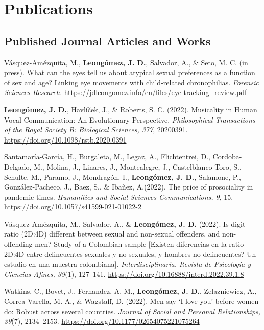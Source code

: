 \documentclass[11pt,a4paper,]{awesome-cv}
\begin{document}
\hypertarget{publications}{%
\section{Publications}\label{publications}}

\hypertarget{section}{%
\subsection{\texorpdfstring{\textbf{Published Journal Articles and Works}}{}}\label{section}}

\begingroup
\setlength{\parindent}{-0.5in}
\setlength{\leftskip}{0.5in}

Vásquez-Amézquita, M., \textbf{Leongómez, J. D.}, Salvador, A., \& Seto,
M. C. (in press). What can the eyes tell us about atypical sexual
preferences as a function of sex and age? Linking eye movements with
child-related chronophilias. \emph{Forensic Sciences Research}.
\url{https://jdleongomez.info/en/files/eye-tracking_review.pdf}

\textbf{Leongómez, J. D.}, Havlíček, J., \& Roberts, S. C. (2022).
Musicality in Human Vocal Communication: An Evolutionary Perspective.
\emph{Philosophical Transactions of the Royal Society B: Biological
Sciences, 377}, 20200391. \url{https://doi.org/10.1098/rstb.2020.0391}

Santamaría-García, H., Burgaleta, M., Legaz, A., Flichtentrei, D.,
Cordoba-Delgado, M., Molina, J., Linares, J., Montealegre, J.,
Castelblanco Toro, S., Schulte, M., Paramo, J., Mondragón, I.,
\textbf{Leongómez, J. D.}, Salamone, P., González‑Pacheco, J., Baez, S.,
\& Ibañez, A.(2022). The price of prosociality in pandemic times.
\emph{Humanities and Social Sciences Communications, 9}, 15.
\url{https://doi.org/10.1057/s41599-021-01022-2}

Vásquez-Amézquita, M., Salvador, A., \& \textbf{Leongómez, J. D.}
(2022). Is digit ratio (2D:4D) different between sexual and non-sexual
offenders, and non-offending men? Study of a Colombian sample {[}Existen
diferencias en la ratio 2D:4D entre delincuentes sexuales y no sexuales,
y hombres no delincuentes? Un estudio en una muestra colombiana{]}.
\emph{Interdisciplinaria. Revista de Psicología y Ciencias Afines,
39}(1), 127--141. \url{https://doi.org/10.16888/interd.2022.39.1.8}

Watkins, C., Bovet, J., Fernandez, A. M., \textbf{Leongómez, J. D.},
Zelazniewicz, A., Correa Varella, M. A., \& Wagstaff, D. (2022). Men say
`I love you' before women do: Robust across several countries.
\emph{Journal of Social and Personal Relationships, 39}(7), 2134--2153.
\url{https://doi.org/10.1177/02654075221075264}
\end{document}

